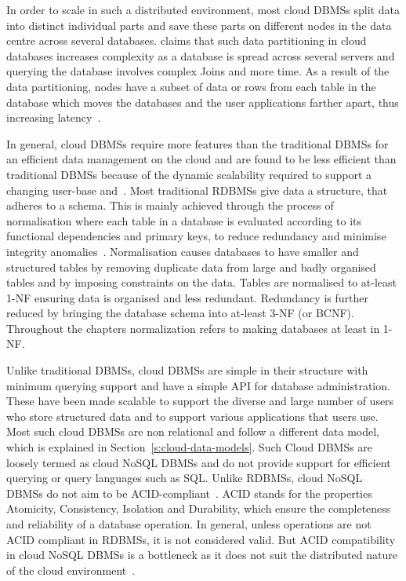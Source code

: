 In order to scale in such a distributed environment, most cloud \acp{DBMS} split
data into distinct individual parts and save these parts on different nodes in
the data centre across several databases. \citet{Hogan} claims that such  data
partitioning in cloud databases increases complexity as a database is spread
across several servers and querying the database involves complex Joins and more
time. As a result of the data partitioning,  nodes  have a subset of data or
rows from each table in the database which moves the databases
and the user applications farther apart, thus increasing latency~\citep{dewitt}.
 
In general,   cloud \acp{DBMS}  require more features than the traditional
\acp{DBMS} for an efficient data management on the cloud and are found to be
less efficient than traditional \acp{DBMS} because of the dynamic scalability
required to support a changing user-base
and~\citep{Abadi,Florescu,Hackl,Hogan,Shietal, Stonebraker2,Stonebraker}.
Most traditional \acp{RDBMS}  give data a structure, that adheres to a schema.
This is mainly achieved through the process of normalisation where each table in
a database is evaluated according to its functional dependencies and primary
keys, to reduce redundancy and minimise integrity anomalies~\citep{Navathe}.
Normalisation causes databases to have smaller and structured tables by removing
duplicate data from large and badly organised tables and by imposing constraints
on the data.   Tables are normalised to at-least \ac{1-NF} ensuring data is
organised and less redundant. Redundancy is further reduced by bringing the
database schema into at-least \ac{3-NF} (or \ac{BCNF}).  Throughout the chapters
normalization refers to making databases at least in \ac{1-NF}.

Unlike traditional \acp{DBMS}, cloud \acp{DBMS} are simple in their structure
with minimum querying support and have a simple API for database administration.
 These have been made scalable to support the diverse and large number of users
who store structured data and to support various applications that users use.
Most such cloud \acp{DBMS} are  non relational and follow a different data
model, which is explained in Section~\ref{s:cloud-data-models}.   Such Cloud
\acp{DBMS} are loosely termed as cloud \ac{NoSQL} \acp{DBMS} and do not provide
support for efficient querying or query languages such as SQL.  Unlike
\acp{RDBMS}, cloud \ac{NoSQL} \acp{DBMS} do not aim to be
ACID-compliant~\citep{Florescu,Han,Stonebraker2,Stonebraker}.
ACID stands for the properties Atomicity,   Consistency,   Isolation and
Durability, which ensure the completeness and reliability of a database
operation.   In general,   unless operations are not ACID compliant in
\acp{RDBMS},   it is not considered valid.  But ACID compatibility in cloud
\ac{NoSQL} \acp{DBMS} is a bottleneck as it does not suit the distributed nature
of the cloud environment~\citep{Stonebraker2,Wada}.

